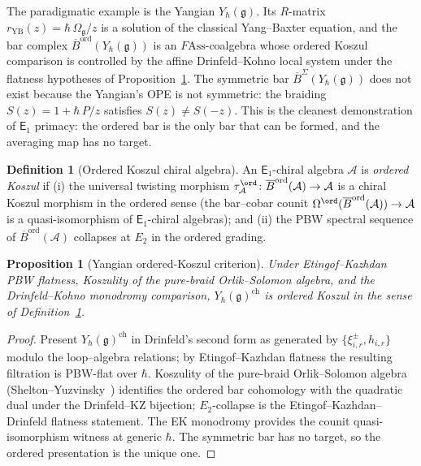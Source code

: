 \documentclass[11pt,reqno]{amsart}
\newtheorem{proposition}[theorem]{Proposition}
\theoremstyle{definition}
\newtheorem{definition}[theorem]{Definition}
\theoremstyle{remark}
\newcommand{\cA}{\mathcal{A}}
\newcommand{\Eone}{\mathsf{E}_{1}}
\newcommand{\Ass}{\mathrm{Ass}}
\newcommand{\fg}{\mathfrak{g}}
\newcommand{\Barord}{\overline{B}^{\mathrm{ord}}}
\newcommand{\BarSig}{\overline{B}^{\Sigma}}
\newcommand{\FMAss}{F\!\Ass}
\numberwithin{equation}{section}
\begin{document}
The paradigmatic example is the Yangian $Y_\hbar(\fg)$. Its
$R$-matrix $r_{\mathrm{YB}}(z) = \hbar\,\Omega_\fg/z$ is a
solution of the classical Yang--Baxter equation, and the bar
complex $\Barord(Y_\hbar(\fg))$ is an $\FMAss$-coalgebra whose
ordered Koszul comparison is controlled by the affine
Drinfeld--Kohno local system under the flatness hypotheses of
Proposition~\ref{prop:yangian-ordered-koszul-sa}. The symmetric bar
$\BarSig(Y_\hbar(\fg))$ does not exist because the Yangian's OPE
is not symmetric: the braiding $S(z) = 1 + \hbar\,P/z$ satisfies
$S(z) \neq S(-z)$. This is the cleanest demonstration of $\Eone$
primacy: the ordered bar is the only bar that can be formed, and
the averaging map has no target.

\begin{definition}[Ordered Koszul chiral algebra]
\label{def:ordered-koszul-chiral-algebra-sa}
An $\Eone$-chiral algebra $\cA$ is \emph{ordered Koszul} if
\textup{(i)} the universal twisting morphism
$\tau^{\ord}_\cA \colon \Barord(\cA) \to \cA$ is a chiral
Koszul morphism in the ordered sense \textup{(}the bar--cobar
counit $\Omega^{\ord}(\Barord(\cA)) \to \cA$ is a
quasi-isomorphism of $\Eone$-chiral algebras\textup{)}; and
\textup{(ii)} the PBW spectral sequence of $\Barord(\cA)$
collapses at $E_2$ in the ordered grading.
\end{definition}

\begin{proposition}[Yangian ordered-Koszul criterion]
\label{prop:yangian-ordered-koszul-sa}
Under Etingof--Kazhdan PBW flatness, Koszulity of the pure-braid
Orlik--Solomon algebra, and the Drinfeld--Kohno monodromy comparison,
$Y_\hbar(\fg)^{\mathrm{ch}}$ is ordered Koszul in the sense of
Definition~\textup{\ref{def:ordered-koszul-chiral-algebra-sa}}.
\end{proposition}

\begin{proof}
Present $Y_\hbar(\fg)^{\mathrm{ch}}$ in Drinfeld's second form as
generated by $\{\xi^{\pm}_{i,r}, h_{i,r}\}$ modulo the
loop--algebra relations; by Etingof--Kazhdan flatness
\textup{\cite{EK96}} the resulting filtration is PBW-flat over
$\hbar$. Koszulity of the pure-braid Orlik--Solomon algebra
(Shelton--Yuzvinsky~\textup{\cite{SheltonYuzvinsky1997}}) identifies
the ordered bar cohomology with the quadratic dual under the
Drinfeld--KZ bijection; $E_2$-collapse is the
Etingof--Kazhdan--Drinfeld flatness statement. The EK monodromy
provides the counit quasi-isomorphism witness at generic
$\hbar$. The symmetric bar has no target, so the ordered
presentation is the unique one.
\end{proof}
\end{document}
